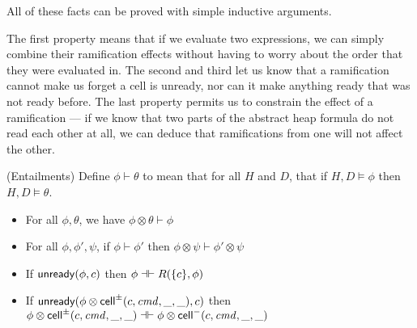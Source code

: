 All of these facts can be proved with simple inductive arguments. 

The first property means that if we evaluate two expressions, we can
simply combine their ramification effects without having to worry
about the order that they were evaluated in. The second and third let
us know that a ramification cannot make us forget a cell is unready,
nor can it make anything ready that was not ready before. The last
property permits us to constrain the effect of a ramification --- if we
know that two parts of the abstract heap formula do not read each
other at all, we can deduce that ramifications from one will not
affect the other.

\begin{prop}{(Entailments)}
Define $\phi \vdash \theta$ to mean that for all $H$ and $D$, that if $H, D \models \phi$ then 
$H, D \models \theta$. 

\begin{itemize}
\item For all $\phi, \theta$, we have $\phi \otimes \theta \vdash \phi$
\item For all $\phi, \phi', \psi$, if $\phi \vdash \phi'$ then $\phi \otimes \psi \vdash \phi' \otimes \psi$  
\item If $\mathsf{unready}({\phi}, {c})$ then $\phi \dashv\vdash R(\{{c}\}, \phi)$
\item If $\mathsf{unready}({\phi \otimes \mathsf{cell}^{\pm}({c}, {\mathit{cmd}}, {\_}, {\_})}, {c})$ then $\phi \otimes \mathsf{cell}^{\pm}({c}, {\mathit{cmd}}, {\_}, {\_}) \dashv\vdash \phi \otimes \mathsf{cell}^{-}({c}, {\mathit{cmd}}, {\_}, {\_})$
\end{itemize}
\end{prop}

